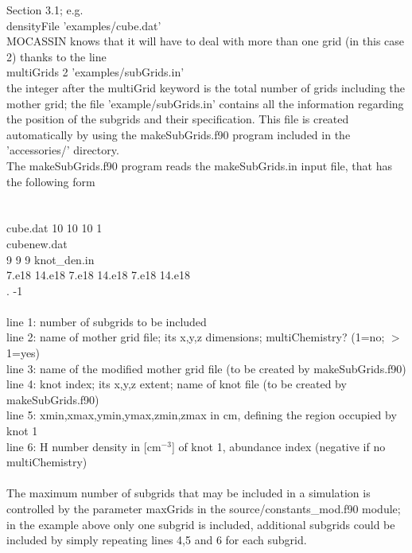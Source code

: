 \documentclass[11pt]{article}
\begin{document}
   Section 3.1; e.g.\\
\indent        densityFile 'examples/cube.dat'\\
\noindent    MOCASSIN knows that it will have to deal with more than one grid (in this case 2) 
   thanks to the line\\
\indent        multiGrids 2 'examples/subGrids.in'\\
\noindent   the integer after the multiGrid keyword is the total number of grids including the 
   mother grid; the file 'example/subGrids.in' contains all the information regarding
   the position of the subgrids and their specification. 
   This file is created automatically by using the makeSubGrids.f90 program included 
   in the 'accessories/' directory. \\
   The makeSubGrids.f90 program reads the makeSubGrids.in input file, that has the 
   following form\\
\\
                                            \\
\indent        cube.dat 10 10 10 1          \\
\indent        cubenew.dat\\
 9 9 9 knot\_den.in\\
\indent        7.e18 14.e18 7.e18 14.e18 7.e18 14.e18\\
. -1\\
\\
\noindent   line 1: number of subgrids to be included\\
\noindent   line 2: name of mother grid file; its x,y,z dimensions; multiChemistry? (1=no; $>$1=yes)\\
\noindent   line 3: name of the modified mother grid file (to be created by makeSubGrids.f90)\\
\noindent   line 4: knot index; its x,y,z extent; name of knot file (to be created by makeSubGrids.f90)\\
\noindent   line 5: xmin,xmax,ymin,ymax,zmin,zmax in cm, defining the region occupied by knot 1\\
\noindent   line 6: H number density in [cm$^{-3}$] of knot 1,  abundance index (negative if no multiChemistry)\\
\\
   The maximum number of subgrids that may be included in a simulation is controlled by the 
   parameter maxGrids in the source/constants\_mod.f90 module; in the example above only 
   one subgrid is included, additional subgrids could be included by simply repeating lines 
   4,5 and 6 for each subgrid. \\
\end{document}
